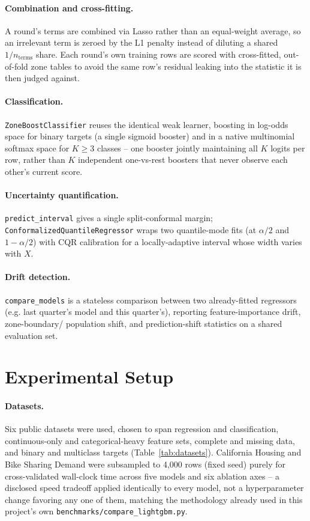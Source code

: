 \documentclass[11pt]{article}
\begin{document}
\paragraph{Combination and cross-fitting.} A round's terms are combined via
Lasso rather than an equal-weight average, so an irrelevant term is zeroed
by the L1 penalty instead of diluting a shared $1/n_\text{terms}$ share.
Each round's own training rows are scored with cross-fitted, out-of-fold
zone tables to avoid the same row's residual leaking into the statistic it
is then judged against.

\paragraph{Classification.} \texttt{ZoneBoostClassifier} reuses the
identical weak learner, boosting in log-odds space for binary targets
(a single sigmoid booster) and in a native multinomial softmax space for
$K \geq 3$ classes -- one booster jointly maintaining all $K$ logits per
row, rather than $K$ independent one-vs-rest boosters that never observe
each other's current score.

\paragraph{Uncertainty quantification.} \texttt{predict\_interval} gives a
single split-conformal margin; \texttt{ConformalizedQuantileRegressor} wraps
two quantile-mode fits (at $\alpha/2$ and $1-\alpha/2$) with CQR
calibration \citep{romano2019cqr} for a locally-adaptive interval whose
width varies with $X$.

\paragraph{Drift detection.} \texttt{compare\_models} is a stateless
comparison between two already-fitted regressors (e.g. last quarter's model
and this quarter's), reporting feature-importance drift, zone-boundary/
population shift, and prediction-shift statistics on a shared evaluation
set.

\section{Experimental Setup}
\label{sec:setup}

\paragraph{Datasets.} Six public datasets were used, chosen to span
regression and classification, continuous-only and categorical-heavy
feature sets, complete and missing data, and binary and multiclass targets
(Table~\ref{tab:datasets}). California Housing and Bike Sharing Demand were
subsampled to 4{,}000 rows (fixed seed) purely for cross-validated
wall-clock time across five models and six ablation axes -- a disclosed
speed tradeoff applied identically to every model, not a hyperparameter
change favoring any one of them, matching the methodology already used in
this project's own \texttt{benchmarks/compare\_lightgbm.py}.
\end{document}
